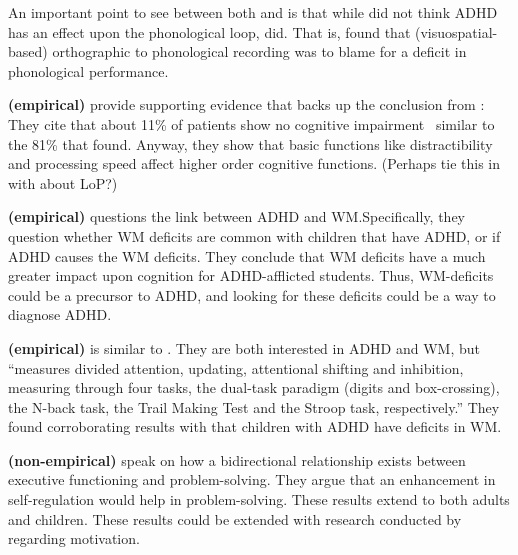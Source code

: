 \documentclass[stu]{apa7}
\begin{document}
An important point to see between both \textcite{raiker_phonological_2019} and \textcite{kofler_working_2020} is that while \textcite{kofler_working_2020} did not think ADHD has an effect upon the phonological loop, \textcite{raiker_phonological_2019} did. That is, \textcite{raiker_phonological_2019} found that (visuospatial-based) orthographic to phonological recording was to blame for a deficit in phonological performance.

\textcite{butzbach_basic_2019} \textbf{(empirical)} provide supporting evidence that backs up the conclusion from \textcite{kofler_working_2020}: They cite that about 11\% of patients show no cognitive impairment \textemdash\ similar to the 81\% that \textcite{kofler_working_2020} found. Anyway, they show that basic functions like distractibility and processing speed affect higher order cognitive functions. (Perhaps tie this in with \cite{raiker_phonological_2019} about LoP?)

\textcite{fried_clinical_2016} \textbf{(empirical)} questions the link between ADHD and WM.\@ Specifically, they question whether WM deficits are common with children that have ADHD, or if ADHD causes the WM deficits. They conclude that WM deficits have a much greater impact upon cognition for ADHD-afflicted students. Thus, WM-deficits could be a precursor to ADHD, and looking for these deficits could be a way to diagnose ADHD.\@

\textcite{elosua_differences_2017} \textbf{(empirical)} is similar to \textcite{fried_clinical_2016}. They are both interested in ADHD and WM, but \textcite{elosua_differences_2017} ``measures divided attention, updating, attentional shifting and inhibition, measuring through four tasks, the dual-task paradigm (digits and box-crossing), the N-back task, the Trail Making Test and the Stroop task, respectively.'' They found corroborating results with \textcite{fried_clinical_2016} that children with ADHD have deficits in WM.\@

\textcite{drigas_executive_2019} \textbf{(non-empirical)} speak on how a bidirectional relationship exists between executive functioning and problem-solving. They argue that an enhancement in self-regulation would help in problem-solving. These results extend to both adults and children. These results could be extended with research conducted by \textcite{skalski_impact_2021} regarding motivation.
\end{document}
